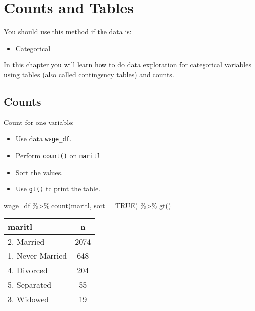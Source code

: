 \documentclass[
]{book}
\newenvironment{Shaded}{\begin{snugshade}}{\end{snugshade}}
\newcommand{\AttributeTok}[1]{\textcolor[rgb]{0.77,0.63,0.00}{#1}}
\newcommand{\ConstantTok}[1]{\textcolor[rgb]{0.00,0.00,0.00}{#1}}
\newcommand{\FunctionTok}[1]{\textcolor[rgb]{0.00,0.00,0.00}{#1}}
\newcommand{\NormalTok}[1]{#1}
\newcommand{\SpecialCharTok}[1]{\textcolor[rgb]{0.00,0.00,0.00}{#1}}
\providecommand{\tightlist}{%
  \setlength{\itemsep}{0pt}\setlength{\parskip}{0pt}}
\begin{document}
\hypertarget{tables}{%
\chapter{Counts and Tables}\label{tables}}

You should use this method if the data is:

\begin{itemize}
\tightlist
\item
  Categorical
\end{itemize}

In this chapter you will learn how to do data exploration for categorical variables using tables (also called contingency tables) and counts.

\hypertarget{counts}{%
\section{Counts}\label{counts}}

Count for one variable:

\begin{itemize}
\tightlist
\item
  Use data \texttt{wage\_df}.
\item
  Perform \href{https://dplyr.tidyverse.org/reference/count.html}{\texttt{count()}} on \texttt{maritl}
\item
  Sort the values.
\item
  Use \href{https://gt.rstudio.com}{\texttt{gt()}} to print the table.
\end{itemize}

\begin{Shaded}
\begin{Highlighting}[]
\NormalTok{wage\_df }\SpecialCharTok{\%\textgreater{}\%} 
  \FunctionTok{count}\NormalTok{(maritl,}
        \AttributeTok{sort =} \ConstantTok{TRUE}\NormalTok{) }\SpecialCharTok{\%\textgreater{}\%} 
  \FunctionTok{gt}\NormalTok{()}
\end{Highlighting}
\end{Shaded}

\captionsetup[table]{labelformat=empty,skip=1pt}
\begin{longtable}{lc}
\toprule
maritl & n \\ 
\midrule
2. Married & 2074 \\ 
1. Never Married & 648 \\ 
4. Divorced & 204 \\ 
5. Separated & 55 \\ 
3. Widowed & 19 \\ 
\bottomrule
\end{longtable}
\end{document}
